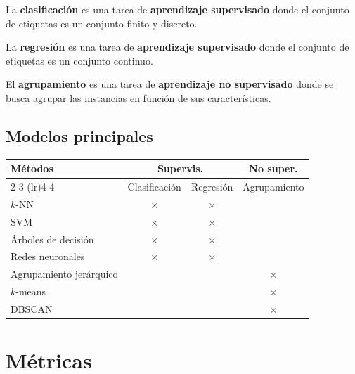 \documentclass[a4,11pt]{aleph-notas}
\begin{document}
\begin{defi}[Clasificación]
    La \textbf{clasificación} es una tarea de \textbf{aprendizaje supervisado} donde el conjunto de etiquetas es un conjunto finito y discreto.
\end{defi}

\begin{defi}[Regresión]
    La \textbf{regresión} es una tarea de \textbf{aprendizaje supervisado} donde el conjunto de etiquetas es un conjunto continuo.
\end{defi}

\begin{defi}[Agrupamiento]
    El \textbf{agrupamiento} es una tarea de \textbf{aprendizaje no supervisado} donde se busca agrupar las instancias en función de sus características.
\end{defi}

\subsection{Modelos principales}

\begin{center}
    \begin{tabular}{l c c c}
        \toprule
        \textbf{Métodos} & \multicolumn{2}{c}{\textbf{Supervis.}} & \textbf{No super.} \\
        \cmidrule(lr){2-3} \cmidrule(lr){4-4}
        & Clasificación & Regresión & Agrupamiento \\
        \midrule
        $k$-NN & $\times$ & $\times$ & \\
        SVM & $\times$ & $\times$ & \\
        Árboles de decisión & $\times$ & $\times$ & \\
        Redes neuronales & $\times$ & $\times$ & \\
        Agrupamiento jerárquico & & & $\times$ \\
        $k$-means & & & $\times$ \\
        DBSCAN & & & $\times$ \\
        \bottomrule
    \end{tabular}
\end{center}

\section{Métricas}
\end{document}
